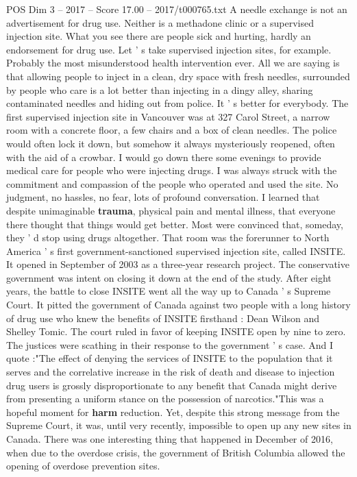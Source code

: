 \begin{textsample}{POS Dim 3 – 2017 – Score 17.00 – 2017/t000765.txt}
A needle exchange is not an advertisement for drug use.
Neither is a methadone clinic or a supervised injection site.
What you see there are people sick and hurting, hardly an endorsement for drug use.
Let ' s take supervised injection sites, for example.
Probably the most misunderstood health intervention ever.
All we are saying is that allowing people to inject in a clean, dry space with fresh needles, surrounded by people who care is a lot better than injecting in a dingy alley, sharing contaminated needles and hiding out from police.
It ' s better for everybody.
The first supervised injection site in Vancouver was at 327 Carol Street, a narrow room with a concrete floor, a few chairs and a box of clean needles.
The police would often lock it down, but somehow it always mysteriously reopened, often with the aid of a crowbar.
I would go down there some evenings to provide medical care for people who were injecting drugs.
I was always struck with the commitment and compassion of the people who operated and used the site.
No judgment, no hassles, no fear, lots of profound conversation.
I learned that despite unimaginable \textbf{trauma}, physical pain and mental illness, that everyone there thought that things would get better.
Most were convinced that, someday, they ' d stop using drugs altogether.
That room was the forerunner to North America ' s first government-sanctioned supervised injection site, called INSITE.
It opened in September of 2003 as a three-year research project.
The conservative government was intent on closing it down at the end of the study.
After eight years, the battle to close INSITE went all the way up to Canada ' s Supreme Court.
It pitted the government of Canada against two people with a long history of drug use who knew the benefits of INSITE firsthand : Dean Wilson and Shelley Tomic.
The court ruled in favor of keeping INSITE open by nine to zero.
The justices were scathing in their response to the government ' s case.
And I quote :"The effect of denying the services of INSITE to the population that it serves and the correlative increase in the risk of death and disease to injection drug users is grossly disproportionate to any benefit that Canada might derive from presenting a uniform stance on the possession of narcotics."This was a hopeful moment for \textbf{harm} reduction.
Yet, despite this strong message from the Supreme Court, it was, until very recently, impossible to open up any new sites in Canada.
There was one interesting thing that happened in December of 2016, when due to the overdose crisis, the government of British Columbia allowed the opening of overdose prevention sites.

\end{textsample}
